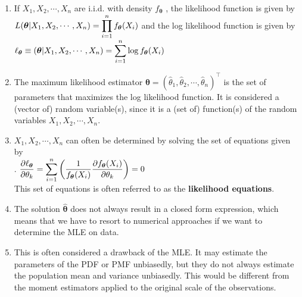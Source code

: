 \begin{enumerate}
    \item If $X_1 , X_2, \cdots , X_n$ are i.i.d. with density $f_{\bm{\theta}}$ , the likelihood function is given by $L (\bm{\theta}|X_1, X_2, \cdots , X_n ) = \displaystyle\prod^n _{i=1} f_{\bm{\theta}} (X_i )$ and the log likelihood function is given by
    $
        \ell_{\bm{\theta}}
        \equiv (\bm{\theta}|X_1, X_2, \cdots , X_n )
        = \displaystyle\sum ^n _{i=1} \log f_{\bm{\theta}} (X_i )
    $
    \hfill \cite{statistics/book/Statistics-for-Data-Scientists/Maurits-Kaptein}

    \item The maximum likelihood estimator $\hat{\bm{\theta}} = ( \hat{\theta}_1, \hat{\theta}_2, \cdots , \hat{\theta}_n )^\top$ is the set of parameters that maximizes the log likelihood function.
    It is considered a (vector of) random variable(s), since it is a (set of) function(s) of the random variables $X_1 , X_2, \cdots , X _n $.
    \hfill \cite{statistics/book/Statistics-for-Data-Scientists/Maurits-Kaptein}

    \item $X_1 , X_2, \cdots , X _n $ can often be determined by solving the set of equations given by
    \hfill \cite{statistics/book/Statistics-for-Data-Scientists/Maurits-Kaptein}
    \\[0.2cm]
    .\hfill
    $
        \dfrac{\partial \ell_{\bm{\theta}}}{\partial\theta_k}
        = \displaystyle\sum^n _{i=1} \left(
            \dfrac{1}{f_{\bm{\theta}} (X _i )}
            \dfrac{\partial f_{\bm{\theta}} (X_i )}{\partial\theta_k}
        \right)
        = 0
    $
    \hfill \cite{statistics/book/Statistics-for-Data-Scientists/Maurits-Kaptein}
    \\[0.2cm]
    This set of equations is often referred to as the \textbf{likelihood equations}.
    \hfill \cite{statistics/book/Statistics-for-Data-Scientists/Maurits-Kaptein}

    \item The solution $\hat{\bm{\theta}}$ does not always result in a closed form expression, which means that we have to resort to numerical approaches if we want to determine the MLE on data.
    \hfill \cite{statistics/book/Statistics-for-Data-Scientists/Maurits-Kaptein}

    \item This is often considered a drawback of the MLE.
    It may estimate the parameters of the PDF or PMF unbiasedly, but they do not always estimate the population mean and variance unbiasedly.
    This would be different from the moment estimators applied to the original scale of the observations.
    \hfill \cite{statistics/book/Statistics-for-Data-Scientists/Maurits-Kaptein}
\end{enumerate}



